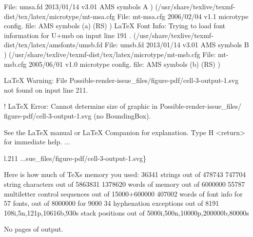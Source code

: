 \documentclass[
  letterpaper,
  DIV=11,
  numbers=noendperiod]{scrartcl}
\newenvironment{Shaded}{\begin{snugshade}}{\end{snugshade}}
\newcommand{\NormalTok}[1]{\textcolor[rgb]{0.00,0.23,0.31}{#1}}
\begin{document}
\begin{Shaded}
\begin{Highlighting}[]
\NormalTok{File: umsa.fd 2013/01/14 v3.01 AMS symbols A}
\NormalTok{) (/usr/share/texlive/texmf{-}dist/tex/latex/microtype/mt{-}msa.cfg}
\NormalTok{File: mt{-}msa.cfg 2006/02/04 v1.1 microtype config. file: AMS symbols (a) (RS)}
\NormalTok{)}
\NormalTok{LaTeX Font Info:    Trying to load font information for U+msb on input line 191}
\NormalTok{.}
\NormalTok{(/usr/share/texlive/texmf{-}dist/tex/latex/amsfonts/umsb.fd}
\NormalTok{File: umsb.fd 2013/01/14 v3.01 AMS symbols B}
\NormalTok{) (/usr/share/texlive/texmf{-}dist/tex/latex/microtype/mt{-}msb.cfg}
\NormalTok{File: mt{-}msb.cfg 2005/06/01 v1.0 microtype config. file: AMS symbols (b) (RS)}
\NormalTok{)}

\NormalTok{LaTeX Warning: File \textasciigrave{}Possible{-}render{-}issue\_files/figure{-}pdf/cell{-}3{-}output{-}1.svg}
\NormalTok{\textquotesingle{} not found on input line 211.}


\NormalTok{! LaTeX Error: Cannot determine size of graphic in Possible{-}render{-}issue\_files/}
\NormalTok{figure{-}pdf/cell{-}3{-}output{-}1.svg (no BoundingBox).}

\NormalTok{See the LaTeX manual or LaTeX Companion for explanation.}
\NormalTok{Type  H \textless{}return\textgreater{}  for immediate help.}
\NormalTok{ ...                                              }
                                                  
\NormalTok{l.211 ...sue\_files/figure{-}pdf/cell{-}3{-}output{-}1.svg\}}
                                                   
\NormalTok{Here is how much of TeX\textquotesingle{}s memory you used:}
\NormalTok{ 36341 strings out of 478743}
\NormalTok{ 747704 string characters out of 5863831}
\NormalTok{ 1378620 words of memory out of 6000000}
\NormalTok{ 55787 multiletter control sequences out of 15000+600000}
\NormalTok{ 407002 words of font info for 57 fonts, out of 8000000 for 9000}
\NormalTok{ 34 hyphenation exceptions out of 8191}
\NormalTok{ 108i,5n,121p,10616b,930s stack positions out of 5000i,500n,10000p,200000b,80000s}

\NormalTok{No pages of output.}
\end{Highlighting}
\end{Shaded}
\end{document}
